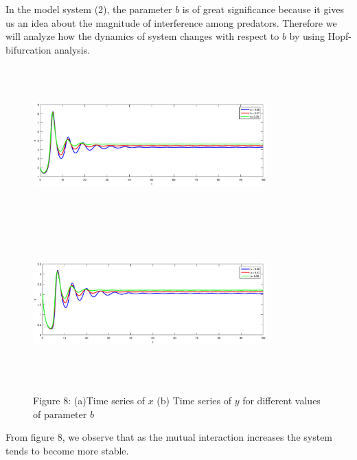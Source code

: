 \documentclass[a4paper, 10pt]{article}
\begin{document}
In the model system (2), the parameter $b$ is of great significance because it gives us an idea about the magnitude of interference among predators. Therefore we will analyze how the dynamics of system changes with respect to $b$ by using Hopf-bifurcation analysis.
\begin{figure}[H]
	{\includegraphics[width=9cm, height=6cm]{15a.eps}}
	\endminipage\hfill
	{\includegraphics[width=9cm, height=6cm]{15b.eps}}
	\endminipage\hfill
	\begin{center} Figure 8: (a)Time series of $x$  (b) Time series of $y$  for different values of parameter $b$   \end{center}
\end{figure}
From figure 8, we observe that as the mutual interaction increases the system tends to become more stable.
\end{document}
